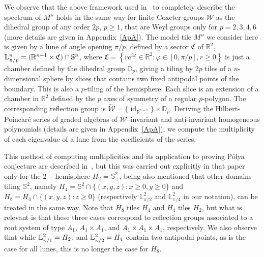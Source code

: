 \documentclass[11pt,a4paper,times]{amsart}
\theoremstyle{plain}
\theoremstyle{definition}
\numberwithin{equation}{section}
\DeclareMathOperator\id{id}
\newcommand{\Se}{\mathbb{S}}
\newcommand{\D}{\mathbb{D}}
\newcommand{\lune}[2]{\mathbb{L}^{#1}_{#2}}
\newcommand{\luned}[2]{\raisebox{0.5pt}{${}$}\mathbb{L}^{#1}_{\pi/#2}}
\begin{document}
{{We observe that the above framework used in~\cite{bb}  {to completely  describe the spectrum of $M''$} holds in the same way for finite Coxeter groups $\mathcal{W}$ as the dihedral group of any order $2p$, $p\geq1$, that are Weyl groups only for $p=2,3,4, 6$ (more details are given  in Appendix~\ref{ApA})}.
The model tile $M''$ we consider here 
is given by a  lune of angle opening   $\pi/p$,  defined by a sector
$\mathfrak{C}$  of  $\mathbb{R}^2$, 
$\luned{n}{p}= (\mathbb{R}^{n-1}\times \mathfrak{C})\cap \mathbb{S}^{n}$,  where
 $\mathfrak{C} =\left\{ re^{i\varphi}\in \mathbb{R}^2:  \varphi\in \left[0,\pi/p\right], r\geq 0 \right\}$ is just a chamber defined by  the dihedral group $\mathbb{D}_p$,  
 giving a tiling by $2p$ tiles of a $n$-dimensional 
 sphere by slices that contains two fixed antipodal points of the boundary. This is also a $p$-tiling
 of the  hemisphere. Each slice is an extension of a chamber in $\mathbb{R}^2$ defined by the  $p$ axes of symmetry of a regular $p$-polygon.
 The corresponding reflection group is  $\tilde{\mathcal{W}}=\{\id_{\mathbb{R}^{n-1}}\}\times \D_p$.
  Deriving the Hilbert-Poincar\'{e} series of graded algebras of $\tilde{\mathcal{W}}$--invariant and anti-invariant homogeneous polynomials  (details are given in  Appendix~\ref{ApA}), we compute  the multiplicity of each eigenvalue of a lune from the  coefficients of the series.
  
This method of computing multiplicities and its application to proving P\'{o}lya conjecture are described in~\cite{bb}, {but this was carried out
  explicitly in that paper only for the $2-$hemisphere $H_2=\mathbb{S}^2_+$, being also mentioned that other domains tiling $\Se^{2}$, namely
  $H_4=\mathbb{S}^2\cap\{(x,y,z): x\geq 0, y\geq 0\}$ and $H_8=H_4\cap\{(x,y,z):z\geq 0\}$ (respectively $\lune{2}{\pi/2}$ and $\lune{2}{\pi/4}$ in
  our notation), can be treated in the same way.}  Note that $H_8$ tiles $H_4$
  and $H_4$ tiles $H_2$, but what is relevant is that these three cases  correspond to  reflection groups associated to a root system of type $A_1$,
  $A_1\times A_1$, and $A_1 \times A_1\times A_1$, respectively.
  We also observe that while $\luned{2}{1}=H_2$, and  $\luned{2}{2}=H_4$  contain two antipodal points, as is the case for all lunes, 
  this is no longer the case for $H_8$.
  
}
\end{document}
